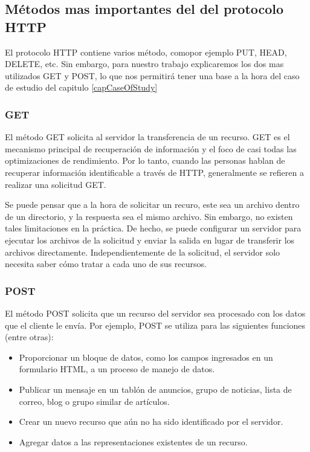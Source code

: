 \subsection{Métodos mas importantes del del protocolo HTTP}

El protocolo HTTP contiene varios método, comopor ejemplo PUT, HEAD, DELETE, etc. Sin
embargo, para nuestro trabajo explicaremos los dos mas utilizados GET y POST, lo que
nos permitirá tener una base a la hora del caso de estudio del capitulo \ref{capCaseOfStudy}


\subsubsection*{GET}

El método GET solicita al servidor la transferencia de un recurso.
GET es el mecanismo principal de recuperación de información y el 
foco de casi todas las optimizaciones de rendimiento. Por lo tanto,
cuando las personas hablan de recuperar información identificable
a través de HTTP, generalmente se refieren a realizar una solicitud
GET.

Se puede pensar que a la hora de solicitar un recuro, este sea un archivo 
dentro de un directorio, y la respuesta sea el mismo archivo. Sin embargo, 
no existen tales limitaciones en la práctica. De hecho, se puede 
configurar un servidor para ejecutar los archivos de la solicitud y 
enviar la salida en lugar de transferir los archivos directamente. 
Independientemente de la solicitud, el servidor solo necesita saber 
cómo tratar a cada uno de sus recursos.

\subsubsection*{POST}

El método POST solicita que un recurso del servidor sea procesado con 
los datos que el cliente le envía. Por ejemplo, POST se utiliza para 
las siguientes funciones (entre otras):

\begin{itemize}
   \item Proporcionar un bloque de datos, como los campos ingresados 
   en un formulario HTML, a un proceso de manejo de datos.
   \item Publicar un mensaje en un tablón de anuncios, grupo de 
   noticias, lista de correo, blog o grupo similar de artículos.
   \item Crear un nuevo recurso que aún no ha sido identificado por 
   el servidor.
   \item Agregar datos a las representaciones existentes de un recurso.
\end{itemize}



